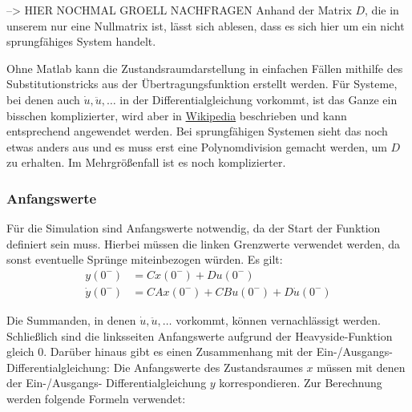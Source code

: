 --> HIER NOCHMAL GROELL NACHFRAGEN
Anhand der Matrix $D$, die in unserem nur eine Nullmatrix ist, lässt sich ablesen, dass es sich hier um ein nicht sprungfähiges System handelt.

Ohne Matlab kann die Zustandsraumdarstellung in einfachen Fällen mithilfe des Substitutionstricks aus der Übertragungsfunktion erstellt werden. Für Systeme, bei denen auch $\dot u, \ddot u, \ldots$ in der Differentialgleichung vorkommt, ist das Ganze ein bisschen komplizierter, wird aber in \href{https://de.wikipedia.org/wiki/Zustandsraumdarstellung#Regelungsnormalform}{Wikipedia} beschrieben und kann entsprechend angewendet werden. Bei sprungfähigen Systemen sieht das noch etwas anders aus und es muss erst eine Polynomdivision gemacht werden, um $D$ zu erhalten. Im Mehrgrößenfall ist es noch komplizierter.

\subsubsection*{Anfangswerte}

Für die Simulation sind Anfangswerte notwendig, da der Start der Funktion definiert sein muss. Hierbei müssen die linken Grenzwerte verwendet werden, da sonst eventuelle Sprünge miteinbezogen würden. Es gilt:
\begin{align*}
    y(0^-) & = Cx(0^-) + Du(0^-) \\
    \dot y(0^-) & = CAx(0^-) + CBu(0^-) + D \dot u (0^-)
\end{align*}

Die Summanden, in denen $\dot u, \ddot u, \ldots$ vorkommt, können vernachlässigt werden. Schließlich sind die linksseiten Anfangswerte aufgrund der Heavyside-Funktion gleich 0.
Darüber hinaus gibt es einen Zusammenhang mit der Ein-/Ausgangs-Differentialgleichung: Die Anfangswerte des Zustandsraumes $x$ müssen mit denen der Ein-/Ausgangs- Differentialgleichung $y$ korrespondieren. Zur Berechnung werden folgende Formeln verwendet:

